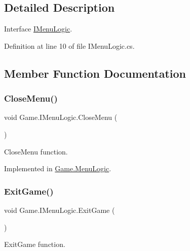\subsection{Detailed Description}
Interface \mbox{\hyperlink{interface_game_1_1_i_menu_logic}{I\+Menu\+Logic}}. 



Definition at line 10 of file I\+Menu\+Logic.\+cs.



\subsection{Member Function Documentation}
\mbox{\label{interface_game_1_1_i_menu_logic_aab0f7fd346ea32f819ec12aee99d3656}} 
\subsubsection{\texorpdfstring{CloseMenu()}{CloseMenu()}}
{\footnotesize\ttfamily void Game.\+I\+Menu\+Logic.\+Close\+Menu (\begin{DoxyParamCaption}{ }\end{DoxyParamCaption})}



Close\+Menu function. 



Implemented in \mbox{\hyperlink{class_game_1_1_menu_logic_adeb1e1749499593128d22ff14e9c3507}{Game.\+Menu\+Logic}}.

\mbox{\label{interface_game_1_1_i_menu_logic_a5db6fe816331b646a2f7a2ac889fff26}} 
\subsubsection{\texorpdfstring{ExitGame()}{ExitGame()}}
{\footnotesize\ttfamily void Game.\+I\+Menu\+Logic.\+Exit\+Game (\begin{DoxyParamCaption}{ }\end{DoxyParamCaption})}



Exit\+Game function. 



